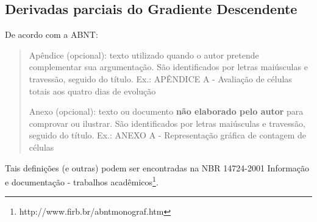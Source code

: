 \begin{apendicesenv}

\partapendices



\chapter{Derivadas parciais do Gradiente Descendente}\label{app:derivadasgraddesc}

De acordo com a ABNT:

\begin{quotation}
Apêndice (opcional): texto utilizado quando o autor pretende complementar sua argumentação. São identificados por letras maiúsculas e travessão, seguido do título. Ex.: APÊNDICE A - Avaliação de células totais aos quatro dias de evolução

Anexo (opcional): texto ou documento \textbf{não elaborado pelo autor} para comprovar ou ilustrar. São identificados por letras maiúsculas e travessão, seguido do título. Ex.: ANEXO A - Representação gráfica de contagem de células
\end{quotation}

Tais definições (e outras) podem ser encontradas na NBR 14724-2001 Informação e documentação - trabalhos acadêmicos\footnote{http://www.firb.br/abntmonograf.htm}.




\end{apendicesenv}

